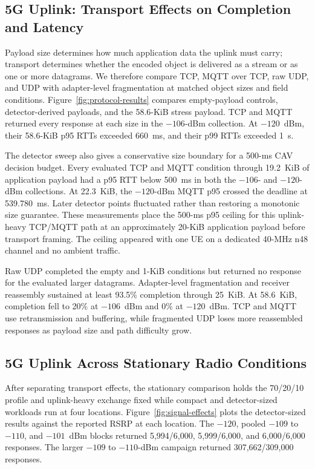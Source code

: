 \subsection{5G Uplink: Transport Effects on Completion and Latency}
\label{sec:results-protocol}

Payload size determines how much application data the uplink must carry;
transport determines whether the encoded object is delivered as a stream or as
one or more datagrams. We therefore compare TCP, MQTT over TCP, raw UDP, and
UDP with adapter-level fragmentation at matched object sizes and field
conditions.
Figure~\ref{fig:protocol-results} compares empty-payload controls, detector-derived
payloads, and the 58.6-KiB stress payload. TCP and MQTT returned every response
at each size in the $-106$-dBm collection. At $-120$~dBm, their 58.6-KiB p95
RTTs exceeded 660~ms, and their p99 RTTs exceeded 1~s.

The detector sweep also gives a conservative size boundary for a 500-ms CAV
decision budget. Every evaluated TCP and MQTT condition through 19.2~KiB of
application payload had a p95 RTT below 500~ms in both the $-106$- and
$-120$-dBm collections. At 22.3~KiB, the $-120$-dBm MQTT p95 crossed the deadline at
539.780~ms. Later detector points fluctuated rather than restoring a monotonic
size guarantee. These measurements place the 500-ms p95 ceiling for this
uplink-heavy TCP/MQTT path at an approximately 20-KiB application payload
before transport framing. The ceiling appeared with one UE on a dedicated
40-MHz n48 channel and no ambient traffic.

Raw UDP completed the empty and 1-KiB conditions but returned no response for
the evaluated larger datagrams. Adapter-level fragmentation and receiver
reassembly sustained at least 93.5\% completion through 25~KiB. At 58.6~KiB,
completion fell to 20\% at $-106$~dBm and 0\% at $-120$~dBm. TCP and MQTT use
retransmission and buffering, while fragmented UDP loses more reassembled
responses as payload size and path difficulty grow.

\subsection{5G Uplink Across Stationary Radio Conditions}
\label{sec:results-signal-tdd}

After separating transport effects, the stationary comparison holds the
70/20/10 profile and uplink-heavy exchange fixed while compact and
detector-sized workloads run at four locations.
Figure~\ref{fig:signal-effects} plots the detector-sized results against the
reported RSRP at each location. The $-120$, pooled $-109$ to $-110$, and
$-101$~dBm blocks returned 5,994/6,000, 5,999/6,000, and 6,000/6,000 responses.
The larger $-109$ to $-110$-dBm campaign returned 307,662/309,000 responses.

